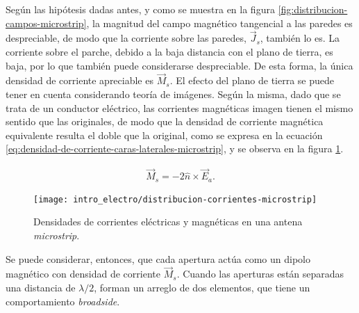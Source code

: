 Según las hipótesis dadas antes, y como se muestra en la figura \ref{fig:distribucion-campos-microstrip}, la magnitud del campo magnético tangencial a las paredes es despreciable, de modo que la corriente sobre las paredes, $\vec{J}_s$, también lo es. La corriente sobre el parche, debido a la baja distancia con el plano de tierra, es baja, por lo que también puede considerarse despreciable. De esta forma, la única densidad de corriente apreciable es $\vec{M}_s$. El efecto del plano de tierra se puede tener en cuenta considerando teoría de imágenes. Según la misma, dado que se trata de un conductor eléctrico, las corrientes magnéticas imagen tienen el mismo sentido que las originales, de modo que la densidad de corriente magnética equivalente resulta el doble que la original, como se expresa en la ecuación \ref{eq:densidad-de-corriente-caras-laterales-microstrip}, y se observa en la figura \ref{fig:densidad-corriente-microstrip}.

\begin{align}
	\label{eq:densidad-de-corriente-caras-laterales-microstrip}
	\vec{M}_s = -2 \hat{n} \times \vec{E}_a.
\end{align}

\begin{figure}[htp]
	\centering
	\texttt{[image: intro\_electro/distribucion-corrientes-microstrip]}
	\caption{Densidades de corrientes eléctricas y magnéticas en una antena \textit{microstrip}.}
	\label{fig:densidad-corriente-microstrip}
\end{figure}

Se puede considerar, entonces, que cada apertura actúa como un dipolo magnético con densidad de corriente $\vec{M}_s$. Cuando las aperturas están separadas una distancia de $\lambda/2$, forman un arreglo de dos elementos, que tiene un comportamiento \textit{broadside}.


